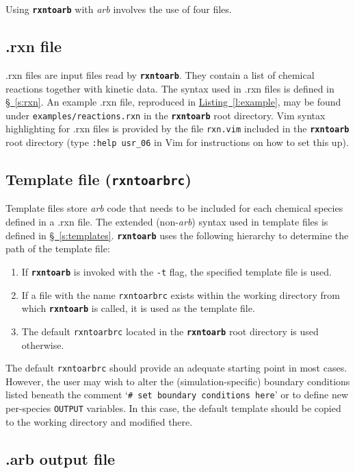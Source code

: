 \documentclass[fontsize=12pt,
               captions=abovetable,
               numbers=noenddot,
              ]{scrartcl}
\newcommand{\listing}[1]{\hyperref[l:#1]{Listing~\ref{l:#1}}}
\newcommand{\sect}[1]{\hyperref[s:#1]{\S~\ref{s:#1}}}
\newcommand{\rxntoarb}{\texttt{\textbf{rxntoarb}}}
\begin{document}
Using \rxntoarb{} with \emph{arb} involves the use of four files.

\subsection{.rxn file}

.rxn files are input files read by \rxntoarb. They contain a list of chemical reactions together with kinetic data. The syntax used in .rxn files is defined in \sect{rxn}. An example .rxn file, reproduced in \listing{example}, may be found under \texttt{examples\slash{}reactions.rxn} in the \rxntoarb{} root directory. Vim syntax highlighting for .rxn files is provided by the file \texttt{rxn.vim} included in the \rxntoarb{} root directory (type \texttt{:help usr\_06} in Vim for instructions on how to set this up).

\subsection{Template file (\texttt{rxntoarbrc})}

Template files store \emph{arb} code that needs to be included for each chemical species defined in a .rxn file. The extended (non-\emph{arb}) syntax used in template files is defined in \sect{templates}. \rxntoarb{} uses the following hierarchy to determine the path of the template file:
\begin{enumerate}
\item If \rxntoarb{} is invoked with the \texttt{-t} flag, the specified template file is used.
\item If a file with the name \texttt{rxntoarbrc} exists within the working directory from which \rxntoarb{} is called, it is used as the template file.
\item The default \texttt{rxntoarbrc} located in the \rxntoarb{} root directory is used otherwise.
\end{enumerate}
The default \texttt{rxntoarbrc} should provide an adequate starting point in most cases. However, the user may wish to alter the (simulation-specific) boundary conditions listed beneath the comment `\texttt{\# set boundary conditions here}' or to define new per-species \texttt{OUTPUT} variables. In this case, the default template should be copied to the working directory and modified there.

\subsection{.arb output file}
\end{document}
